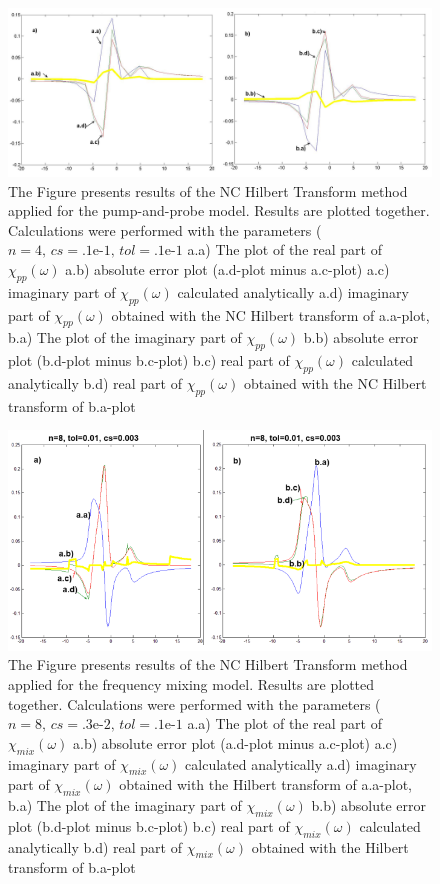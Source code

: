 \documentclass[12pt,twoside,a4paper]{article}
\numberwithin{equation}{subsection}
\numberwithin{figure}{subsection}
\begin{document}
\begin{figure} 
  \includegraphics[width=150mm]{img/nc_pnp.png}
  \caption{ The Figure presents results of the NC Hilbert Transform method applied for the pump-and-probe model. Results
   are plotted together. Calculations were performed with the parameters ($n=4, \,cs=\mbox{.1e-1}, \,tol=\mbox{.1e-1}$
     a.a) The plot of the real part of ${\chi_{pp}}(\omega )$
     a.b) absolute error plot (a.d-plot minus a.c-plot) 
     a.c) imaginary part of ${\chi_{pp}}(\omega )$ calculated analytically 
     a.d) imaginary part of ${\chi_{pp}}(\omega )$ obtained with the NC Hilbert transform of a.a-plot, 
     b.a) The plot of the imaginary part of ${\chi_{pp}}(\omega )$ 
     b.b) absolute error plot (b.d-plot minus b.c-plot) 
     b.c) real part of $\chi_{pp} (\omega )$ calculated analytically 
     b.d) real part of ${\chi_{pp}}(\omega )$ obtained with the NC Hilbert transform of b.a-plot 
     \label{fig:nc_pnp}
     }
\end{figure} 

\begin{figure} 
  \includegraphics[width=150mm]{img/nc_fmix1.png}
  \caption{ The Figure presents results of the NC Hilbert Transform method applied for the frequency mixing model.
  Results are plotted together. Calculations were performed with the parameters ($n=8, \,cs=\mbox{.3e-2}, \,tol=\mbox{.1e-1}$
     a.a) The plot of the real part of ${\chi_{mix}}(\omega )$
     a.b) absolute error plot (a.d-plot minus a.c-plot) 
     a.c) imaginary part of ${\chi_{mix}}(\omega )$ calculated analytically 
     a.d) imaginary part of ${\chi_{mix}}(\omega )$ obtained with the Hilbert transform of a.a-plot, 
     b.a) The plot of the imaginary part of ${\chi_{mix}}(\omega )$ 
     b.b) absolute error plot (b.d-plot minus b.c-plot) 
     b.c) real part of $\chi_{mix} (\omega )$ calculated analytically 
     b.d) real part of ${\chi_{mix}}(\omega )$ obtained with the Hilbert transform of b.a-plot 
     \label{fig:nc_fmix1}
     }
\end{figure}
\end{document}
